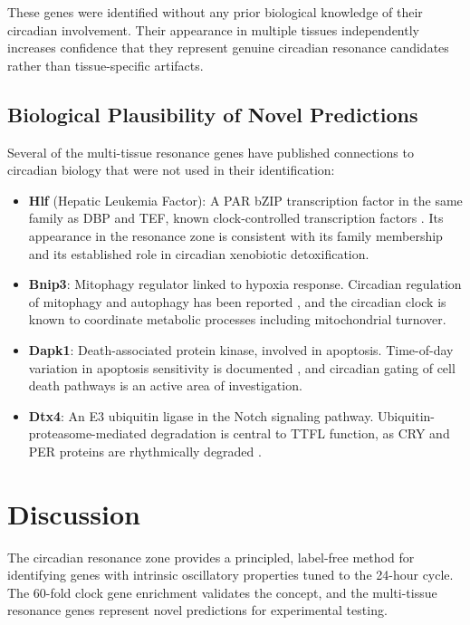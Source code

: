 \documentclass[11pt,letterpaper]{article}
\begin{document}
These genes were identified without any prior biological knowledge of their circadian involvement. Their appearance in multiple tissues independently increases confidence that they represent genuine circadian resonance candidates rather than tissue-specific artifacts.

\subsection{Biological Plausibility of Novel Predictions}

Several of the multi-tissue resonance genes have published connections to circadian biology that were not used in their identification:

\begin{itemize}
\item \textbf{Hlf} (Hepatic Leukemia Factor): A PAR bZIP transcription factor in the same family as DBP and TEF, known clock-controlled transcription factors \citep{gachon2006parbzip}. Its appearance in the resonance zone is consistent with its family membership and its established role in circadian xenobiotic detoxification.
\item \textbf{Bnip3}: Mitophagy regulator linked to hypoxia response. Circadian regulation of mitophagy and autophagy has been reported \citep{ma2021circadian}, and the circadian clock is known to coordinate metabolic processes including mitochondrial turnover.
\item \textbf{Dapk1}: Death-associated protein kinase, involved in apoptosis. Time-of-day variation in apoptosis sensitivity is documented \citep{matsuo2003control}, and circadian gating of cell death pathways is an active area of investigation.
\item \textbf{Dtx4}: An E3 ubiquitin ligase in the Notch signaling pathway. Ubiquitin-proteasome-mediated degradation is central to TTFL function, as CRY and PER proteins are rhythmically degraded \citep{takahashi2017transcriptional}.
\end{itemize}

\section{Discussion}

The circadian resonance zone provides a principled, label-free method for identifying genes with intrinsic oscillatory properties tuned to the 24-hour cycle. The 60-fold clock gene enrichment validates the concept, and the multi-tissue resonance genes represent novel predictions for experimental testing.
\end{document}
